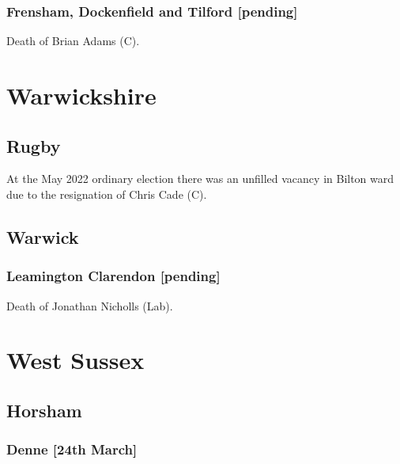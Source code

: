 \documentclass[a4paper,openany]{book}
\begin{document}
\begin{resultsiii}
\subsubsection*{Frensham, Dockenfield and Tilford \hspace*{\fill}\nolinebreak[1]%
	\enspace\hspace*{\fill}
	[pending]}


Death of Brian Adams (C).

\section{Warwickshire}

\subsection*{Rugby}

At the May 2022 ordinary election there was an unfilled vacancy in Bilton ward due to the resignation of Chris Cade (C).%

\subsection*{Warwick}

\subsubsection*{Leamington Clarendon \hspace*{\fill}\nolinebreak[1]%
	\enspace\hspace*{\fill}
	[pending]}


Death of Jonathan Nicholls (Lab).

\section{West Sussex}

\subsection*{Horsham}

\subsubsection*{Denne \hspace*{\fill}\nolinebreak[1]%
	\enspace\hspace*{\fill}
	[24th March]}


\end{resultsiii}
\end{document}
